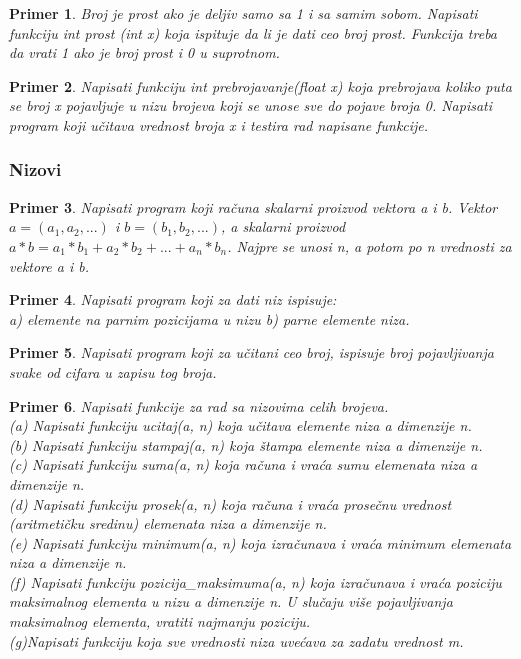 \documentclass[a4paper]{article}
\newtheorem{primer}{Primer}[section]
\begin{document}
\begin{primer}
Broj je prost ako je deljiv samo sa 1 i sa samim sobom.
Napisati funkciju int prost (int x) koja ispituje da li je dati ceo broj prost.
Funkcija treba da vrati 1 ako je broj prost i 0 u suprotnom. 
\end{primer}

\begin{primer}

Napisati funkciju int prebrojavanje(float x) koja prebrojava
koliko puta se broj x pojavljuje u nizu brojeva koji se unose sve do pojave
broja 0. Napisati program koji učitava vrednost broja x i testira rad napisane
funkcije.
\end{primer}

\subsubsection{Nizovi}

\begin{primer}
Napisati program koji računa skalarni proizvod vektora a i b. Vektor $a=(a_1, a_2,...)$ i $b=(b_1, b_2,...)$, a skalarni proizvod $a*b= a_1 * b_1 + a_2 * b_2 + ... + a_n * b_n$. Najpre se unosi n, a potom po n vrednosti za vektore a i b. 
\end{primer}

\begin{primer}
Napisati program koji za dati niz ispisuje:\\
a) elemente na parnim pozicijama u nizu
b) parne elemente niza.
\end{primer}

\begin{primer}
Napisati program koji za učitani ceo broj, ispisuje broj
pojavljivanja svake od cifara u zapisu tog broja.
\end{primer}


\begin{primer}
Napisati funkcije za rad sa nizovima celih brojeva.\\
(a) Napisati funkciju ucitaj(a, n) koja učitava elemente niza a dimenzije n.\\
(b) Napisati funkciju stampaj(a, n) koja štampa elemente niza a dimenzije n.\\
(c) Napisati funkciju suma(a, n) koja računa i vraća sumu
elemenata niza a dimenzije n.\\
(d) Napisati funkciju prosek(a, n) koja računa i vraća prosečnu
vrednost (aritmetičku sredinu) elemenata niza a dimenzije n.\\
(e) Napisati funkciju minimum(a, n) koja izračunava i vraća
minimum elemenata niza a dimenzije n.\\
(f) Napisati funkciju pozicija\_maksimuma(a, n) koja izračunava
i vraća poziciju maksimalnog elementa u nizu a dimenzije n. U slučaju
više pojavljivanja maksimalnog elementa, vratiti najmanju poziciju.\\
(g)Napisati funkciju koja sve vrednosti niza uvećava za zadatu vrednost m.
\end{primer}
\end{document}

